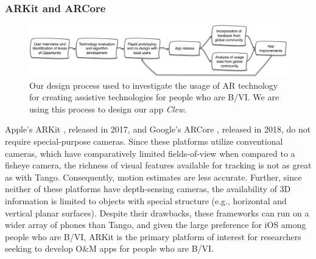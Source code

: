 \documentclass[chi]{sigchi}
\newcommand{\BVI}{B/VI\xspace}
\newcommand{\OM}{O\&M\xspace}
\begin{document}
\subsubsection{ARKit and ARCore}
\begin{figure}
\includegraphics[width=\linewidth]{Figures/designprocess}
\caption{Our design process used to investigate the usage of AR technology for creating assistive technologies for people who are \BVI.  We are using this process to design our app \emph{Clew}.\label{fig:designprocess}}
\end{figure}
Apple's ARKit \cite{arkit}, released in 2017, and Google's ARCore \cite{arcore}, released in 2018, do not require special-purpose cameras.  Since these platforms utilize conventional cameras, which have comparatively limited fields-of-view when compared to a fisheye camera, the richness of visual features available for tracking is not as great as with Tango.  Consequently, motion estimates are less accurate.  Further, since neither of these platforms have depth-sensing cameras, the availability of 3D information is limited to objects with special structure (e.g., horizontal and vertical planar surfaces).  Despite their drawbacks, these frameworks can run on a wider array of phones than Tango, and given the large preference for iOS among people who are \BVI \cite{morris2014blind}, ARKit is the primary platform of interest for researchers seeking to develop \OM apps for people who are \BVI.

\end{document}
